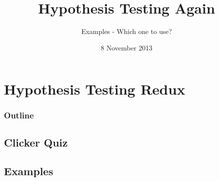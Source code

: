 
\section{Hypothesis Testing Redux}

\title{Hypothesis Testing Again}
\subtitle{Examples - Which one to use?}

\date{8 November 2013}

\begin{frame}
  \titlepage
\end{frame}

\begin{frame}
  \frametitle{Outline}
  \tableofcontents[hideothersubsections,sectionstyle=show/hide]
\end{frame}


\subsection{Clicker Quiz}


%
%
%
%
%
%

\begin{frame}
\end{frame}

\subsection{Examples}

